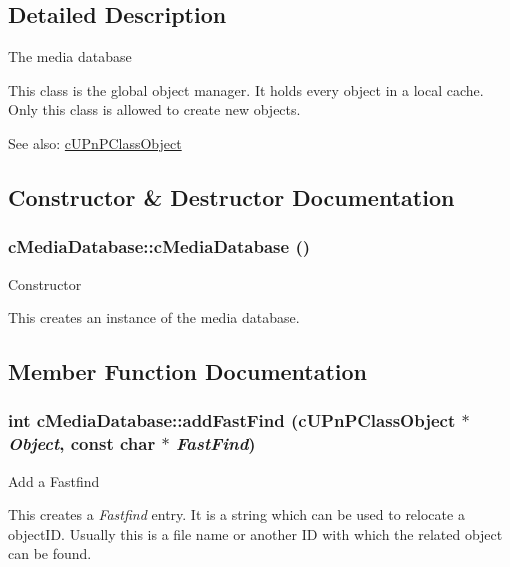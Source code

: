 \subsection{Detailed Description}
The media database

This class is the global object manager. It holds every object in a local cache. Only this class is allowed to create new objects.

\begin{Desc}
\item[See also:]\hyperlink{classcUPnPClassObject}{cUPnPClassObject} \end{Desc}


\subsection{Constructor \& Destructor Documentation}
\hypertarget{classcMediaDatabase_ace0720fbddbdd7f2e4ca5ad16d5acd2}{
\subsubsection[{cMediaDatabase}]{\setlength{\rightskip}{0pt plus 5cm}cMediaDatabase::cMediaDatabase ()}}
\label{classcMediaDatabase_ace0720fbddbdd7f2e4ca5ad16d5acd2}


Constructor

This creates an instance of the media database. 

\subsection{Member Function Documentation}
\hypertarget{classcMediaDatabase_1aec38e63143c7eb26012f1c74fe373d}{
\subsubsection[{addFastFind}]{\setlength{\rightskip}{0pt plus 5cm}int cMediaDatabase::addFastFind ({\bf cUPnPClassObject} $\ast$ {\em Object}, \/  const char $\ast$ {\em FastFind})}}
\label{classcMediaDatabase_1aec38e63143c7eb26012f1c74fe373d}


Add a Fastfind

This creates a {\em Fastfind\/} entry. It is a string which can be used to relocate a objectID. Usually this is a file name or another ID with which the related object can be found.

